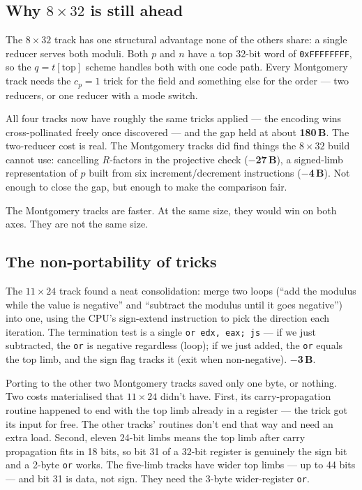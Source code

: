 \documentclass[11pt,a4paper]{article}
\newcommand{\bytes}[1]{\textcolor{blue!60!black}{\textbf{#1\,B}}}
\newcommand{\saved}[1]{\textcolor{green!50!black}{\textbf{$-$#1\,B}}}
\begin{document}
\subsection{Why $8 \times 32$ is still ahead}

The $8 \times 32$ track has one structural advantage none of the
others share: a single reducer serves both moduli. Both $p$ and $n$
have a top 32-bit word of \texttt{0xFFFFFFFF}, so the
$q=t[\text{top}]$ scheme handles both with one code path. Every
Montgomery track needs the $c_p = 1$ trick for the field and
something else for the order --- two reducers, or one reducer with a
mode switch.

All four tracks now have roughly the same tricks applied --- the
encoding wins cross-pollinated freely once discovered --- and the gap
held at about \bytes{180}. The two-reducer cost is real. The
Montgomery tracks did find things the $8 \times 32$ build cannot use:
cancelling $R$-factors in the projective check (\saved{27}), a
signed-limb representation of $p$ built from six increment/decrement
instructions (\saved{4}). Not enough to close the gap, but enough to
make the comparison fair.

The Montgomery tracks are faster. At the same size, they would win on
both axes. They are not the same size.

\subsection{The non-portability of tricks}

The $11 \times 24$ track found a neat consolidation: merge two loops
(``add the modulus while the value is negative'' and ``subtract the
modulus until it goes negative'') into one, using the CPU's
sign-extend instruction to pick the direction each iteration. The
termination test is a single \texttt{or edx, eax; js} --- if we just
subtracted, the \texttt{or} is negative regardless (loop); if we just
added, the \texttt{or} equals the top limb, and the sign flag tracks
it (exit when non-negative). \saved{3}.

Porting to the other two Montgomery tracks saved only one byte, or
nothing. Two costs materialised that $11 \times 24$ didn't have.
First, its carry-propagation routine happened to end with the top limb
already in a register --- the trick got its input for free. The other
tracks' routines don't end that way and need an extra load. Second,
eleven 24-bit limbs means the top limb after carry propagation fits in
18 bits, so bit 31 of a 32-bit register is genuinely the sign bit and
a 2-byte \texttt{or} works. The five-limb tracks have wider top limbs
--- up to 44 bits --- and bit 31 is data, not sign. They need the
3-byte wider-register \texttt{or}.
\end{document}
